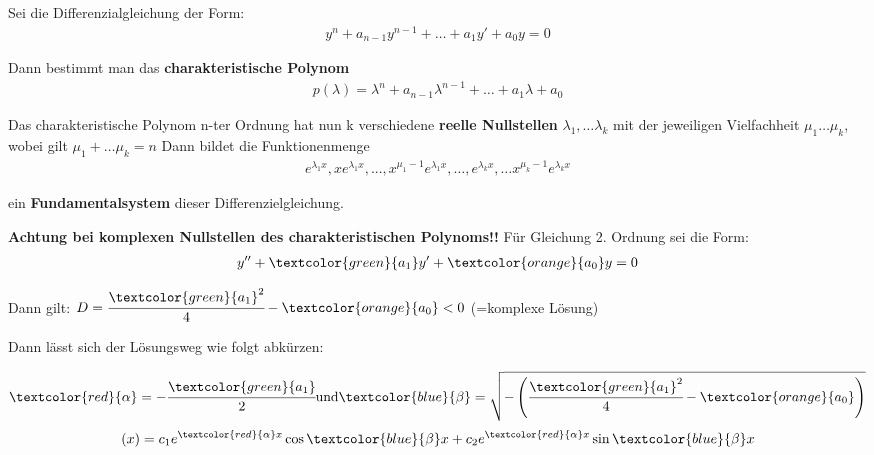 \documentclass[german]{latex4ei/latex4ei_sheet}
\begin{document}
\begin{sectionbox}
Sei die Differenzialgleichung der Form:
\begin{align*}
    y^{n} + a_{n-1} y^{n-1} + \dots + a_1 y' + a_0 y = 0
\end{align*}  

Dann bestimmt man das \textbf{charakteristische Polynom}
\begin{align*}
    p(\lambda) = \lambda^n + a_{n-1}\lambda^{n-1} + \dots + a_1 \lambda + a_0 
\end{align*} 

Das charakteristische Polynom n-ter Ordnung hat nun k verschiedene \textbf{reelle Nullstellen} $\lambda_1, \dots \lambda_k$ mit der jeweiligen Vielfachheit $\mu_1 \dots \mu_k$, wobei gilt $ \mu_1+ \dots \mu_k = n$
\newline 
Dann bildet die Funktionenmenge 
\begin{align*}
  e^{\lambda_1 x} , xe^{\lambda_1x}, ..., x^{\mu_1-1}e^{\lambda_1x}, \dots , e^{\lambda_k x},\dots x^{\mu_k-1}e^{\lambda_kx}
\end{align*}

ein \textbf{Fundamentalsystem} dieser Differenzielgleichung. 


\textbf{Achtung bei komplexen Nullstellen des charakteristischen Polynoms!!}
Für Gleichung 2. Ordnung sei die Form:
\begin{align*}
    y'' + \textcolor{green}{a_1}y' + \textcolor{orange}{a_0} y = 0   
\end{align*}


Dann gilt: $D = \cfrac{\textcolor{green}{a_1}^2}{4} - \textcolor{orange}{a_0} < 0$                           
(=komplexe Lösung) 

Dann lässt sich der Lösungsweg wie folgt abkürzen:

$$    \textcolor{red}{\alpha} = - \cfrac{\textcolor{green}{a_1}}{2} \text{und} \textcolor{blue}{\beta} = \sqrt{-\left(\cfrac{\textcolor{green}{a_1}^2}{4} - \textcolor{orange}{a_0} \right) } $$ \newline
$$(x) = c_1 e^{\textcolor{red}{\alpha} x} \cos{\textcolor{blue}{\beta} x} + c_2 e^{\textcolor{red}{\alpha} x} \sin{\textcolor{blue}{\beta} x}$$

\end{sectionbox}
\end{document}
